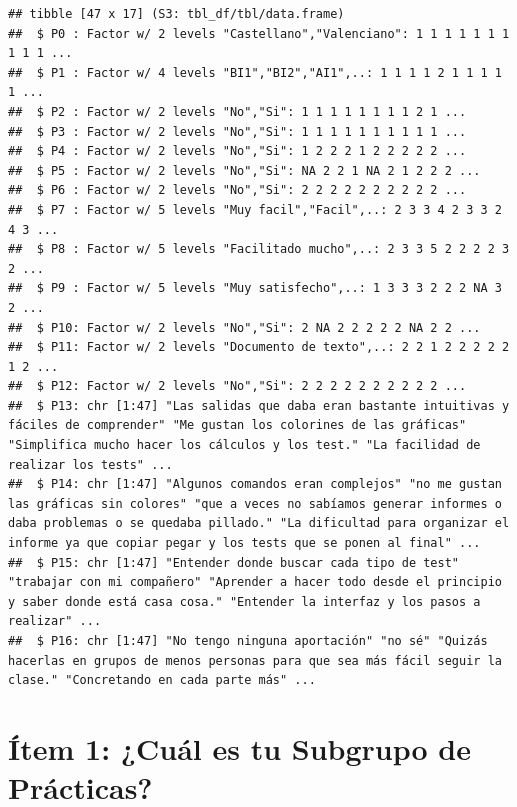 \documentclass[
]{article}
\begin{document}
\begin{verbatim}
## tibble [47 x 17] (S3: tbl_df/tbl/data.frame)
##  $ P0 : Factor w/ 2 levels "Castellano","Valenciano": 1 1 1 1 1 1 1 1 1 1 ...
##  $ P1 : Factor w/ 4 levels "BI1","BI2","AI1",..: 1 1 1 1 2 1 1 1 1 1 ...
##  $ P2 : Factor w/ 2 levels "No","Si": 1 1 1 1 1 1 1 1 2 1 ...
##  $ P3 : Factor w/ 2 levels "No","Si": 1 1 1 1 1 1 1 1 1 1 ...
##  $ P4 : Factor w/ 2 levels "No","Si": 1 2 2 2 1 2 2 2 2 2 ...
##  $ P5 : Factor w/ 2 levels "No","Si": NA 2 2 1 NA 2 1 2 2 2 ...
##  $ P6 : Factor w/ 2 levels "No","Si": 2 2 2 2 2 2 2 2 2 2 ...
##  $ P7 : Factor w/ 5 levels "Muy facil","Facil",..: 2 3 3 4 2 3 3 2 4 3 ...
##  $ P8 : Factor w/ 5 levels "Facilitado mucho",..: 2 3 3 5 2 2 2 2 3 2 ...
##  $ P9 : Factor w/ 5 levels "Muy satisfecho",..: 1 3 3 3 2 2 2 NA 3 2 ...
##  $ P10: Factor w/ 2 levels "No","Si": 2 NA 2 2 2 2 2 NA 2 2 ...
##  $ P11: Factor w/ 2 levels "Documento de texto",..: 2 2 1 2 2 2 2 2 1 2 ...
##  $ P12: Factor w/ 2 levels "No","Si": 2 2 2 2 2 2 2 2 2 2 ...
##  $ P13: chr [1:47] "Las salidas que daba eran bastante intuitivas y fáciles de comprender" "Me gustan los colorines de las gráficas" "Simplifica mucho hacer los cálculos y los test." "La facilidad de realizar los tests" ...
##  $ P14: chr [1:47] "Algunos comandos eran complejos" "no me gustan las gráficas sin colores" "que a veces no sabíamos generar informes o daba problemas o se quedaba pillado." "La dificultad para organizar el informe ya que copiar pegar y los tests que se ponen al final" ...
##  $ P15: chr [1:47] "Entender donde buscar cada tipo de test" "trabajar con mi compañero" "Aprender a hacer todo desde el principio y saber donde está casa cosa." "Entender la interfaz y los pasos a realizar" ...
##  $ P16: chr [1:47] "No tengo ninguna aportación" "no sé" "Quizás hacerlas en grupos de menos personas para que sea más fácil seguir la clase." "Concretando en cada parte más" ...
\end{verbatim}

\hypertarget{uxedtem-1-cuuxe1l-es-tu-subgrupo-de-pruxe1cticas}{%
\section{Ítem 1: ¿Cuál es tu Subgrupo de
Prácticas?}\label{uxedtem-1-cuuxe1l-es-tu-subgrupo-de-pruxe1cticas}}
\end{document}
